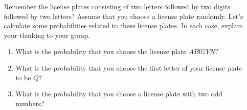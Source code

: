 \documentclass[noauthor,nooutcomes]{ximera}
\begin{document}
\begin{problem}
Remember the license plates consisting of two letters followed by two digits followed by two letters? Assume that you choose a license plate randomly. Let's calculate some probabilities related to these license plates. In each case, explain your thinking to your group.
\begin{enumerate}
	\item What is the probability that you choose the license plate $AB07YN$?
	\item What is the probability that you choose the first letter of your license plate to be $Q$?
	\item What is the probability that you choose a license plate with two odd numbers?
\end{enumerate}\vfill
\end{problem}



\newpage
\end{document}
